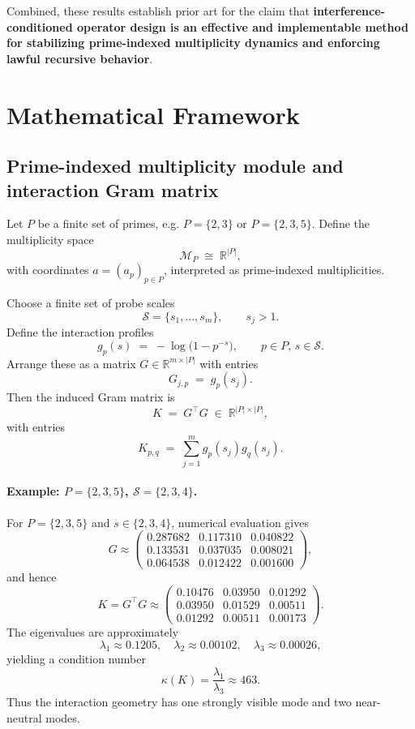 \documentclass[11pt]{article}
\begin{document}
Combined, these results establish prior art for the claim that \textbf{interference-conditioned operator design is an effective and implementable method for stabilizing prime-indexed multiplicity dynamics and enforcing lawful recursive behavior}.

\section{Mathematical Framework}

\subsection{Prime-indexed multiplicity module and interaction Gram matrix}

Let $P$ be a finite set of primes, e.g. $P=\{2,3\}$ or $P=\{2,3,5\}$. Define the multiplicity space
\[
  \mathcal{M}_P \;\cong\; \mathbb{R}^{|P|},
\]
with coordinates $a=(a_p)_{p\in P}$, interpreted as prime-indexed multiplicities.

Choose a finite set of probe scales
\[
  \mathcal{S} = \{s_1, \dots, s_m\},\qquad s_j > 1.
\]
Define the interaction profiles
\[
  g_p(s) \;=\; -\log\bigl(1 - p^{-s}\bigr),\qquad p\in P,\, s\in\mathcal{S}.
\]
Arrange these as a matrix $G \in \mathbb{R}^{m \times |P|}$ with entries
\[
  G_{j,p} \;=\; g_p(s_j).
\]
Then the induced Gram matrix is
\[
  K \;=\; G^\top G \;\in\; \mathbb{R}^{|P|\times |P|},
\]
with entries
\[
  K_{p,q} \;=\; \sum_{j=1}^m g_p(s_j) g_q(s_j).
\]

\paragraph{Example: $P=\{2,3,5\}$, $\mathcal{S}=\{2,3,4\}$.}

For $P=\{2,3,5\}$ and $s\in\{2,3,4\}$, numerical evaluation gives
\[
G \approx
\begin{pmatrix}
0.287682 & 0.117310 & 0.040822\\
0.133531 & 0.037035 & 0.008021\\
0.064538 & 0.012422 & 0.001600
\end{pmatrix},
\]
and hence
\[
K = G^\top G \approx
\begin{pmatrix}
0.10476 & 0.03950 & 0.01292 \\
0.03950 & 0.01529 & 0.00511 \\
0.01292 & 0.00511 & 0.00173
\end{pmatrix}.
\]
The eigenvalues are approximately
\[
  \lambda_1 \approx 0.1205,\quad
  \lambda_2 \approx 0.00102,\quad
  \lambda_3 \approx 0.00026,
\]
yielding a condition number
\[
  \kappa(K) = \frac{\lambda_1}{\lambda_3} \approx 463.
\]
Thus the interaction geometry has one strongly visible mode and two near-neutral modes.
\end{document}
